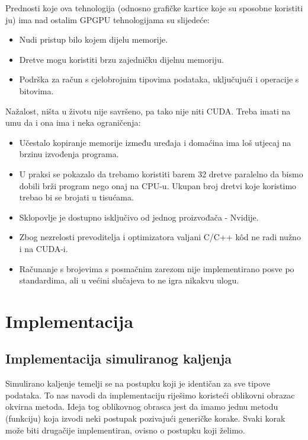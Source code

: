 \documentclass[times, utf8, zavrsni]{fer}
\begin{document}
Prednosti koje ova tehnologija (odnosno grafičke kartice koje su
sposobne koristiti ju) ima nad ostalim GPGPU tehnologijama
su slijedeće:

\begin{itemize}
\item
Nudi pristup bilo kojem dijelu memorije. 

\item
Dretve mogu koristiti brzu zajedničku dijelnu memoriju. 

\item
Podrška za račun s cjelobrojnim tipovima podataka, uključujući
i operacije s bitovima.
\end{itemize}

Nažalost, ništa u životu nije savršeno, pa tako nije niti CUDA.
Treba imati na umu da i ona ima i neka ograničenja:

\begin{itemize}
\item
Učestalo kopiranje memorije između uređaja i domaćina ima loš
utjecaj na brzinu izvođenja programa.

\item
U praksi se pokazalo da trebamo koristiti barem 32 dretve paralelno
da bismo dobili brži program nego onaj na CPU-u. Ukupan broj dretvi
koje koristimo trebao bi se brojati u tisućama. 

\item
Sklopovlje je dostupno isključivo od jednog proizvođača - Nvidije. 

\item
Zbog nezrelosti prevoditelja i optimizatora valjani C/C++ kôd
ne radi nužno i na CUDA-i. 

\item
Računanje s brojevima s posmačnim zarezom nije implementirano posve
po standardima, ali u većini slučajeva to ne igra nikakvu ulogu.
\end{itemize}







\chapter{Implementacija}
\label{chapter:Implementacija}


\section{Implementacija simuliranog kaljenja}
Simulirano kaljenje temelji se na postupku koji je identičan
za sve tipove podataka. To nas navodi da implementaciju 
riješimo koristeći oblikovni obrazac okvirna metoda. 
Ideja tog oblikovnog obrasca jest da imamo jednu
metodu (funkciju) koja izvodi neki postupak pozivajući
generičke korake. Svaki korak može biti drugačije implementiran,
ovisno o postupku koji želimo. 
\end{document}
